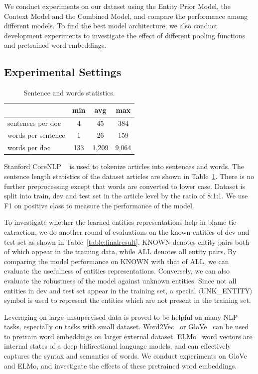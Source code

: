 \documentclass[letterpaper]{article}
\begin{document}
We conduct experiments on our dataset using the Entity Prior Model, the Context Model and the Combined Model, and compare the performance among different models. To find the best model architecture, we also conduct development experiments to investigate the effect of different pooling functions and pretrained word embeddings.

\subsection{Experimental Settings}

\begin{table}[t!]
\centering
\begin{tabular}{l c c c} 
 \hline
 &{\bf min} & {\bf avg}  &{\bf max} \\ 
 \hline\hline
sentences per doc & 4 & 45 & 384 \\ 
words per sentence & 1 & 26 & 159 \\
words per doc & 133 & 1,209 & 9,064 \\
 \hline
\end{tabular}
\caption{Sentence and words statistics.}
\label{table:lengthstatistic}
\end{table}

Stanford CoreNLP ~\cite{manning-EtAl:2014:P14-5} is used to tokenize articles into sentences and words. The sentence length statistics of the dataset articles are shown in Table~\ref{table:lengthstatistic}. There is no further preprocessing except that words are converted to lower case. Dataset is split into train, dev and test set in the article level by the ratio of 8:1:1. We use F1 on positive class to measure the performance of the model.

To investigate whether the learned entities representations help in blame tie extraction, we do another round of evaluations on the known entities of dev and test set as shown in Table~\ref{table:finalresult}. KNOWN denotes entity pairs both of which appear in the training data, while ALL denotes all entity pairs. By comparing the model performance on KNOWN with that of ALL, we can evaluate the usefulness of entities representations. Conversely, we can also evaluate the robustness of the model against unknown entities. Since not all entities in dev and test set appear in the training set, a special $\langle$UNK\_ENTITY$\rangle$ symbol is used to represent the entities which are not present in the training set.

Leveraging on large unsupervised data is proved to be helpful on many NLP tasks, especially on tasks with small dataset. Word2Vec~\cite{DBLP:journals/corr/abs-1301-3781} or GloVe~\cite{pennington2014glove} can be used to pretrain word embeddings on larger external dataset. ELMo~\cite{Peters:2018} word vectors are internal states of a deep bidirectional language models, and can effectively captures the syntax and semantics of words. We conduct experiments on GloVe and ELMo, and investigate the effects of these pretrained word embeddings.
\end{document}
